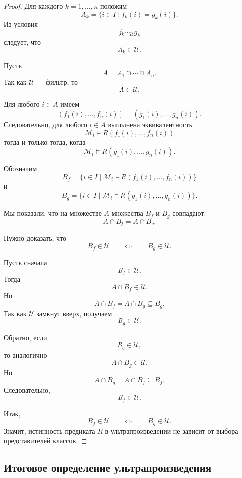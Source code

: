 \documentclass[12pt,a4paper,oneside,openany]{book}
\theoremstyle{definition}
\theoremstyle{plain}
\theoremstyle{remark}
\begin{document}
\begin{proof}
Для каждого $k=1,\ldots,n$ положим
\[
A_k
=
\{i\in I\mid f_k(i)=g_k(i)\}.
\]
Из условия
\[
f_k\sim_{\mathcal U} g_k
\]
следует, что
\[
A_k\in\mathcal U.
\]

Пусть
\[
A=A_1\cap\cdots\cap A_n.
\]
Так как $\mathcal U$ — фильтр, то
\[
A\in\mathcal U.
\]

Для любого $i\in A$ имеем
\[
(f_1(i),\ldots,f_n(i))
=
(g_1(i),\ldots,g_n(i)).
\]
Следовательно, для любого $i\in A$ выполнена эквивалентность
\[
\mathcal M_i\models R(f_1(i),\ldots,f_n(i))
\]
тогда и только тогда, когда
\[
\mathcal M_i\models R(g_1(i),\ldots,g_n(i)).
\]

Обозначим
\[
B_f
=
\{i\in I\mid
\mathcal M_i\models R(f_1(i),\ldots,f_n(i))
\}
\]
и
\[
B_g
=
\{i\in I\mid
\mathcal M_i\models R(g_1(i),\ldots,g_n(i))
\}.
\]

Мы показали, что на множестве $A$ множества $B_f$ и $B_g$ совпадают:
\[
A\cap B_f=A\cap B_g.
\]

Нужно доказать, что
\[
B_f\in\mathcal U
\qquad
\Longleftrightarrow
\qquad
B_g\in\mathcal U.
\]

Пусть сначала
\[
B_f\in\mathcal U.
\]
Тогда
\[
A\cap B_f\in\mathcal U.
\]
Но
\[
A\cap B_f=A\cap B_g
\subseteq B_g.
\]
Так как $\mathcal U$ замкнут вверх, получаем
\[
B_g\in\mathcal U.
\]

Обратно, если
\[
B_g\in\mathcal U,
\]
то аналогично
\[
A\cap B_g\in\mathcal U.
\]
Но
\[
A\cap B_g=A\cap B_f
\subseteq B_f.
\]
Следовательно,
\[
B_f\in\mathcal U.
\]

Итак,
\[
B_f\in\mathcal U
\qquad
\Longleftrightarrow
\qquad
B_g\in\mathcal U.
\]
Значит, истинность предиката $R$ в ультрапроизведении не зависит от выбора представителей классов.
\end{proof}

\subsection{Итоговое определение ультрапроизведения}
\end{document}
